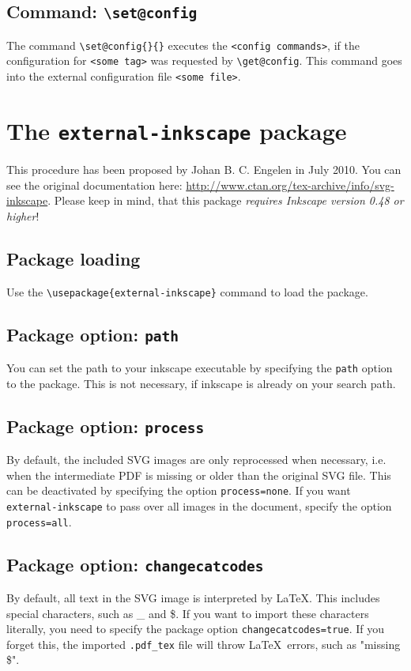 \documentclass{article}
\let\otextbackslash\textbackslash
\renewcommand\textbackslash{{\rmfamily\otextbackslash}}
\begin{document}
\subsection{Command: \texttt{\textbackslash set@config}}
The command \texttt{\textbackslash set@config\{<some tag>\}\{<config commands>\}} executes the \texttt{<config commands>}, if the configuration for \texttt{<some tag>}
was requested by \texttt{\textbackslash get@config}. This command goes into the external configuration file \texttt{<some file>}.



\section{The \texttt{external-inkscape} package}
This procedure has been proposed by Johan B. C. Engelen in July 2010. You can see the original documentation here: \url{http://www.ctan.org/tex-archive/info/svg-inkscape}. Please keep in mind, that this package \emph{requires Inkscape version 0.48 or higher}!

\subsection{Package loading}
Use the \texttt{\textbackslash usepackage\{external-inkscape\}} command to load the package. 

\subsection{Package option: \texttt{path}}
You can set the path to your inkscape executable by specifying the \texttt{path} option to the package. This is not necessary, if inkscape is already on your search path.

\subsection{Package option: \texttt{process}}
By default, the included SVG images are only reprocessed when necessary, i.e. when the intermediate PDF is missing or older than the original SVG file. This can be deactivated by specifying the option \texttt{process=none}. If you want \texttt{external-inkscape} to pass over all images in the document, specify the option \texttt{process=all}.

\subsection{Package option: \texttt{changecatcodes}}
By default, all text in the SVG image is interpreted by \LaTeX. This includes special characters, such as \_ and \$. If you want to import these characters literally, you need to specify the package option \texttt{changecatcodes=true}. If you forget this, the imported \texttt{.pdf\_tex} file will throw \LaTeX\ errors, such as "missing \$".
\end{document}
